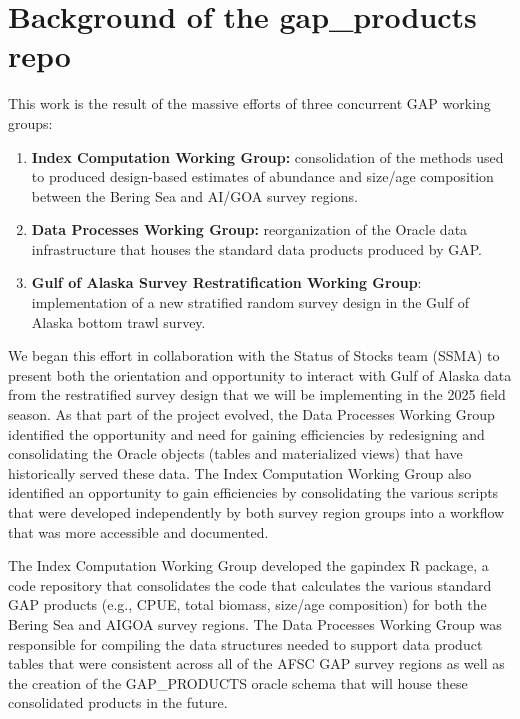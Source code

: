 \documentclass[
  letterpaper,
  oneside,
  open=any]{scrbook}
\begin{document}
\hypertarget{background-of-the-gap_products-repo}{%
\section*{Background of the gap\_products
repo}\label{background-of-the-gap_products-repo}}


This work is the result of the massive efforts of three concurrent GAP
working groups:

\begin{enumerate}
\def\labelenumi{(\arabic{enumi})}
\item
  \textbf{Index Computation Working Group:} consolidation of the methods
  used to produced design-based estimates of abundance and size/age
  composition between the Bering Sea and AI/GOA survey regions.
\item
  \textbf{Data Processes Working Group:} reorganization of the Oracle
  data infrastructure that houses the standard data products produced by
  GAP.
\item
  \textbf{Gulf of Alaska Survey Restratification Working Group}:
  implementation of a new stratified random survey design in the Gulf of
  Alaska bottom trawl survey.
\end{enumerate}

We began this effort in collaboration with the Status of Stocks team
(SSMA) to present both the orientation and opportunity to interact with
Gulf of Alaska data from the restratified survey design that we will be
implementing in the 2025 field season. As that part of the project
evolved, the Data Processes Working Group identified the opportunity and
need for gaining efficiencies by redesigning and consolidating the
Oracle objects (tables and materialized views) that have historically
served these data. The Index Computation Working Group also identified
an opportunity to gain efficiencies by consolidating the various scripts
that were developed independently by both survey region groups into a
workflow that was more accessible and documented.

The Index Computation Working Group developed the gapindex R package, a
code repository that consolidates the code that calculates the various
standard GAP products (e.g., CPUE, total biomass, size/age composition)
for both the Bering Sea and AIGOA survey regions. The Data Processes
Working Group was responsible for compiling the data structures needed
to support data product tables that were consistent across all of the
AFSC GAP survey regions as well as the creation of the GAP\_PRODUCTS
oracle schema that will house these consolidated products in the future.
\end{document}
